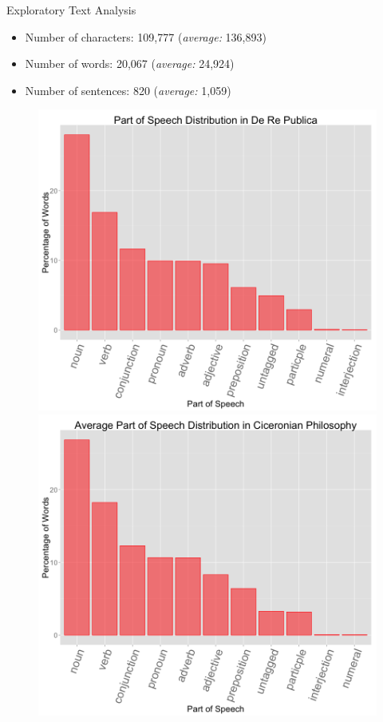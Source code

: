 \documentclass{beamer}
\begin{document}
\begin{frame}{Exploratory Text Analysis}
\begin{itemize}
	\item Number of characters: 109,777 \tab (\textit{average:} 136,893)
	\item Number of words: 20,067 \tab (\textit{average:} 24,924)
	\item Number of sentences: 820 \tab (\textit{average:} 1,059)
\end{itemize}



\begin{figure}
	\centering
	\begin{minipage}{.5\textwidth}
		\centering
		\includegraphics[scale=0.19]{fig1.png}
	\end{minipage}%
	\begin{minipage}{.5\textwidth}
		\centering
		\includegraphics[scale=0.19]{fig2.png}
	\end{minipage}
\end{figure}
\end{frame}
\end{document}
